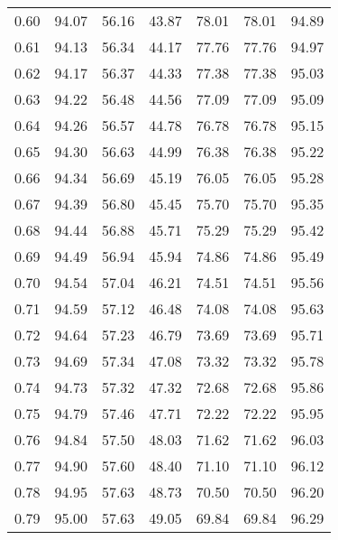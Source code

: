\begin{tabular}{|c|c|c|c|c|c|c|}
      0.60 &     94.07 &     56.16 &      43.87 &   78.01 &      78.01 &         94.89 \\
      0.61 &     94.13 &     56.34 &      44.17 &   77.76 &      77.76 &         94.97 \\
      0.62 &     94.17 &     56.37 &      44.33 &   77.38 &      77.38 &         95.03 \\
      0.63 &     94.22 &     56.48 &      44.56 &   77.09 &      77.09 &         95.09 \\
      0.64 &     94.26 &     56.57 &      44.78 &   76.78 &      76.78 &         95.15 \\
      0.65 &     94.30 &     56.63 &      44.99 &   76.38 &      76.38 &         95.22 \\
      0.66 &     94.34 &     56.69 &      45.19 &   76.05 &      76.05 &         95.28 \\
      0.67 &     94.39 &     56.80 &      45.45 &   75.70 &      75.70 &         95.35 \\
      0.68 &     94.44 &     56.88 &      45.71 &   75.29 &      75.29 &         95.42 \\
      0.69 &     94.49 &     56.94 &      45.94 &   74.86 &      74.86 &         95.49 \\
      0.70 &     94.54 &     57.04 &      46.21 &   74.51 &      74.51 &         95.56 \\
      0.71 &     94.59 &     57.12 &      46.48 &   74.08 &      74.08 &         95.63 \\
      0.72 &     94.64 &     57.23 &      46.79 &   73.69 &      73.69 &         95.71 \\
      0.73 &     94.69 &     57.34 &      47.08 &   73.32 &      73.32 &         95.78 \\
      0.74 &     94.73 &     57.32 &      47.32 &   72.68 &      72.68 &         95.86 \\
      0.75 &     94.79 &     57.46 &      47.71 &   72.22 &      72.22 &         95.95 \\
      0.76 &     94.84 &     57.50 &      48.03 &   71.62 &      71.62 &         96.03 \\
      0.77 &     94.90 &     57.60 &      48.40 &   71.10 &      71.10 &         96.12 \\
      0.78 &     94.95 &     57.63 &      48.73 &   70.50 &      70.50 &         96.20 \\
      0.79 &     95.00 &     57.63 &      49.05 &   69.84 &      69.84 &         96.29 \\

\end{tabular}
